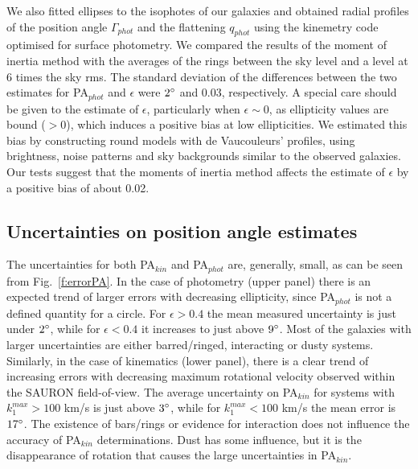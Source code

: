 \documentclass[usenatbib,usegraphicx]{mn2e}
\begin{document}
We also fitted ellipses to the isophotes of our galaxies and obtained radial profiles of the position angle $\Gamma_{phot}$ and the flattening $q_{phot}$ using the kinemetry code optimised for surface photometry.  We compared the results of the moment of inertia method with the averages of the rings between the sky level and a level at 6 times the sky rms. The standard deviation of the differences between the two estimates for PA$_{phot}$ and $\epsilon$ were $2\hbox{$^\circ$}$ and 0.03, respectively. A special care should be given to the estimate of $\epsilon$, particularly when $\epsilon \sim 0$, as ellipticity values are bound ($> 0$),  which induces a positive bias at low ellipticities. We estimated this bias by constructing round models with de Vaucouleurs' profiles, using brightness, noise patterns and sky backgrounds similar to the observed galaxies. Our tests suggest that the moments of inertia method affects the estimate of $\epsilon$ by a positive bias of about 0.02.


\subsection{Uncertainties on position angle estimates}
\label{ss:errors}


The uncertainties for both PA$_{kin}$ and PA$_{phot}$ are, generally, small, as can be seen from  Fig.~\ref{f:errorPA}. In the case of photometry (upper panel) there is an expected trend of larger errors with decreasing ellipticity, since PA$_{phot}$ is not a defined quantity for a circle. For $\epsilon > 0.4$ the mean measured uncertainty is just under $2\hbox{$^\circ$}$, while for $\epsilon< 0.4$ it increases to just above $9\hbox{$^\circ$}$. Most of the galaxies with larger uncertainties are either barred/ringed, interacting or dusty systems. Similarly, in the case of kinematics (lower panel), there is a clear trend of increasing errors with decreasing maximum rotational velocity observed within the SAURON field-of-view. The average uncertainty on PA$_{kin}$ for systems with $k^{max}_{1}> 100$ km/s is just above $3\hbox{$^\circ$}$, while for $k^{max}_{1}< 100$ km/s the mean error is $17\hbox{$^\circ$}$. The existence of bars/rings or evidence for interaction does not influence the accuracy of PA$_{kin}$ determinations. Dust has some influence, but it is the disappearance of rotation that causes the large uncertainties in PA$_{kin}$.
\end{document}
